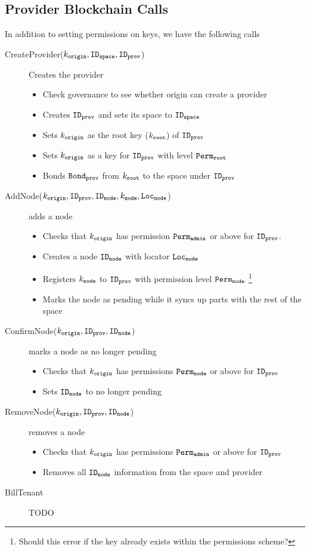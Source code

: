 \subsection{Provider Blockchain Calls}
In addition to setting permissions on keys, we have the following calls
\begin{description}
  \item[CreateProvider($k_\mathtt{origin}, \mathtt{ID_{space}}, \mathtt{ID_{prov}}$)] Creates the provider
    \begin{itemize}
      \item Check governance to see whether origin can create a provider
      \item Creates $\mathtt{ID_{prov}}$ and sets its space to $\mathtt{ID_{space}}$
      \item Sets $k_\mathtt{origin}$ as the root key ($k_\mathtt{root}$) of $\mathtt{ID_{prov}}$
      \item Sets $k_\mathtt{origin}$ as a key for $\mathtt{ID_{prov}}$ with level $\mathtt{Perm_{root}}$
      \item Bonds $\mathtt{Bond_{prov}}$ from $k_\mathtt{root}$ to the space under $\mathtt{ID_{prov}}$
    \end{itemize}
  \item[AddNode($k_\mathtt{origin}, \mathtt{ID_{prov}}, \mathtt{ID_{node}}, k_\mathtt{node}, \mathtt{Loc_{node}}$)] adds a node
    \begin{itemize}
      \item Checks that $k_\mathtt{origin}$ has permission $\mathtt{Perm_{admin}}$ or above for $\mathtt{ID_{prov}}$.
      \item Creates a node $\mathtt{ID_{node}}$ with locator $\mathtt{Loc_{node}}$
      \item Registers $k_\mathtt{node}$ to $\mathtt{ID_{prov}}$ with permission level $\mathtt{Perm_{node}}$ \footnote{Should this error if the key already exists within the permissions scheme?}
      \item Marks the node as pending while it syncs up parts with the rest of the space
    \end{itemize}
  \item[ConfirmNode($k_\mathtt{origin}, \mathtt{ID_{prov}}, \mathtt{ID_{node}}$)] marks a node as no longer pending
    \begin{itemize}
      \item Checks that $k_\mathtt{origin}$ has permissions $\mathtt{Perm_{node}}$ or above for $\mathtt{ID_{prov}}$
      \item Sets $\mathtt{ID_{node}}$ to no longer pending
    \end{itemize}
  \item[RemoveNode($k_\mathtt{origin}, \mathtt{ID_{prov}}, \mathtt{ID_{node}}$)] removes a node
    \begin{itemize}
      \item Checks that $k_\mathtt{origin}$ has permissions $\mathtt{Perm_{admin}}$ or above for $\mathtt{ID_{prov}}$
      \item Removes all $\mathtt{ID_{node}}$ information from the space and provider
    \end{itemize}
  \item[BillTenant] TODO
\end{description}

